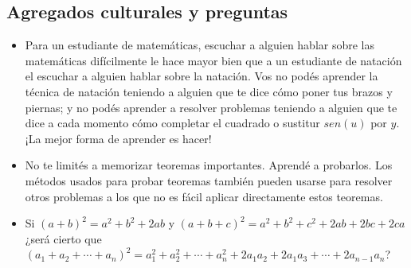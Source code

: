 \subsection{Agregados culturales y preguntas}
{
    \begin{itemize}
        \item Para un estudiante de matemáticas, escuchar a alguien hablar sobre las matemáticas difícilmente le hace mayor bien que a un estudiante de natación el escuchar a alguien hablar sobre la natación.
        Vos no podés aprender la técnica de natación teniendo a alguien que te dice cómo poner tus brazos y piernas; y no podés aprender a resolver problemas teniendo a alguien que te dice a cada momento cómo completar el cuadrado o sustitur $sen(u)$ por $y$.
        ¡La mejor forma de aprender es hacer!
        \item No te limités a memorizar teoremas importantes. Aprendé a probarlos. Los métodos usados para probar teoremas también pueden usarse para resolver otros problemas a los que no es fácil aplicar directamente estos teoremas.
        \item Si $(a + b)^2 = a^2 + b^2 + 2ab$ y $(a + b + c)^2 = a^2 + b^2 + c^2 + 2ab + 2bc + 2ca$ ¿será cierto que $(a_1 + a_2 + \cdots + a_n)^2 = a_1^2 + a_2^2 + \cdots + a_n^2 + 2a_1 a_2 + 2a_1 a_3 + \cdots + 2a_{n-1}a_n$?
    \end{itemize}
}

